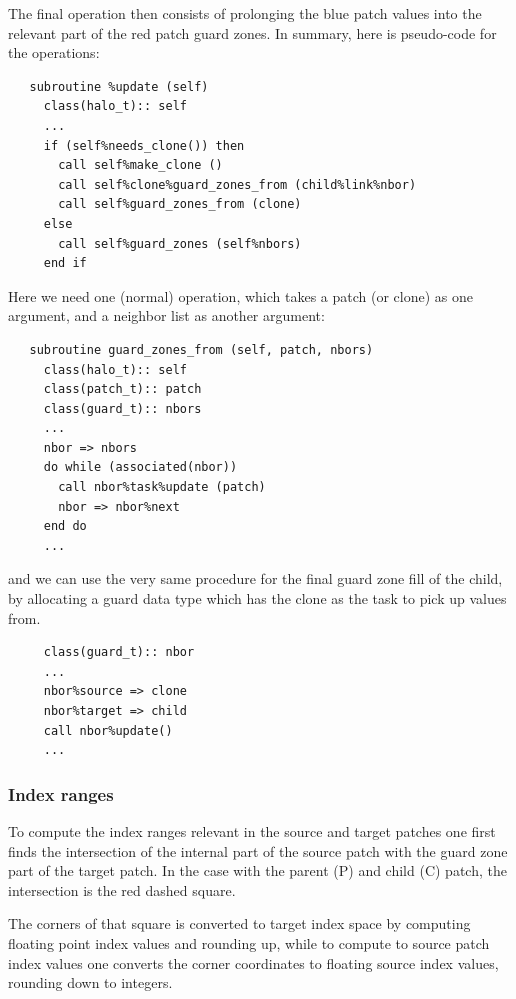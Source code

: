 \documentclass[paper=a4,fontsize=11pt]{scrartcl}
\numberwithin{equation}{section}		%
\numberwithin{figure}{section}			%
\numberwithin{table}{section}				%
\newcommand{\codecolor}{\color{Blue}}
\begin{document}
The final operation then consists of prolonging the blue patch values into the relevant part of the red patch guard zones.  In summary, here is pseudo-code for the operations:
{\codecolor
\begin{verbatim}
   subroutine %update (self)
     class(halo_t):: self
     ...
     if (self%needs_clone()) then
       call self%make_clone ()
       call self%clone%guard_zones_from (child%link%nbor)
       call self%guard_zones_from (clone)
     else
       call self%guard_zones (self%nbors)
     end if
\end{verbatim}}
Here we need one (normal) operation, which takes a patch (or clone) as one argument, and a neighbor list as another argument:
{\codecolor
\begin{verbatim}
   subroutine guard_zones_from (self, patch, nbors)
     class(halo_t):: self
     class(patch_t):: patch
     class(guard_t):: nbors
     ...
     nbor => nbors
     do while (associated(nbor))
       call nbor%task%update (patch)
       nbor => nbor%next
     end do
     ...
\end{verbatim}}
and we can use the very same procedure for the final guard zone fill of the child, by allocating a guard data type which has the clone as the task to pick up values from.
{\codecolor
\begin{verbatim}
     class(guard_t):: nbor
     ...
     nbor%source => clone
     nbor%target => child
     call nbor%update()
     ...
\end{verbatim}}

\subsubsection{Index ranges}
To compute the index ranges relevant in the source and target patches one first finds the intersection of the internal part of the source patch with the guard zone part of the target patch.  In the case with the parent (P) and child (C) patch, the intersection is the red dashed square.

The corners of that square is converted to target index space by computing floating point index values and rounding up, while to compute to source patch index values one converts the corner coordinates to floating source index values, rounding down to integers.

\end{document}
